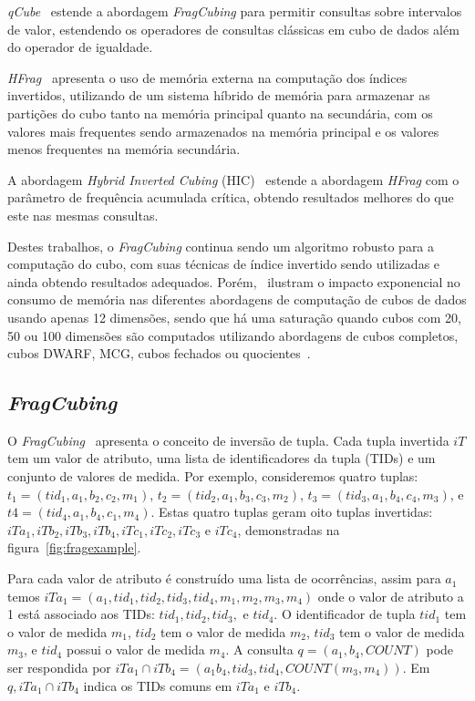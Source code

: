 \textit{qCube}~\cite{silvaQCubeEfficientIntegration2013} estende a abordagem \textit{FragCubing} para permitir consultas sobre intervalos de valor, estendendo os operadores de consultas clássicas em cubo de dados além do operador de igualdade.

\textit{HFrag}~\cite{silvaHybridMemoryData2015} apresenta o uso de memória externa na computação dos índices invertidos, utilizando de um sistema híbrido de memória para armazenar as partições do cubo tanto na memória principal quanto na secundária, com os valores mais frequentes sendo armazenados na memória principal e os valores menos frequentes na memória secundária.

A abordagem \textit{Hybrid Inverted Cubing} (HIC)~\cite{silvaComputingBIGData2016} estende a abordagem \textit{HFrag} com o parâmetro de frequência acumulada crítica, obtendo resultados melhores do que este nas mesmas consultas.

Destes trabalhos, o \textit{FragCubing} continua sendo um algoritmo robusto para a computação do cubo, com suas técnicas de índice invertido sendo utilizadas e ainda obtendo resultados adequados.
Porém,~ ilustram o impacto exponencial no consumo de memória nas diferentes abordagens de computação de cubos de dados usando apenas 12 dimensões, sendo que há uma saturação quando cubos com 20, 50 ou 100 dimensões são computados utilizando abordagens de cubos completos, cubos DWARF, MCG, cubos fechados ou quocientes~\cite{silva:2015:abordagensParaCubo}.

\subsection{\textit{FragCubing}}\label{ch:corr:cube:frag}

O \textit{FragCubing}~\cite{liHighdimensionalOLAPMinimal2004} apresenta o conceito de inversão de tupla.
Cada tupla invertida $iT$ tem um valor de atributo, uma lista de identificadores da tupla (TIDs) e um conjunto de valores de medida.
Por exemplo, consideremos quatro tuplas: $t_1 = (tid_1, a_1, b_2, c_2, m_1)$, $t_2 = (tid_2, a_1, b_3, c_3, m_2)$, $t_3 = (tid_3, a_1, b_4, c_4, m_3)$, e $t4 = (tid_4, a_1, b_4, c_1, m_4)$.
Estas quatro tuplas geram oito tuplas invertidas: $iTa_1, iTb_2, iTb_3, iTb_4, iTc_1, iTc_2, iTc_3$ e $iTc_4$, demonstradas na figura~\ref{fig:fragexample}.

Para cada valor de atributo é construído uma lista de ocorrências, assim para $a_1$ temos $iTa_1 = (a_1, tid_1, tid_2, tid_3, tid_4, m_1, m_2, m_3, m_4)$ onde o valor de atributo a 1 está associado aos TIDs: $tid_1, tid_2, tid_3,$ e $tid_4$.
O identificador de tupla $tid_1$ tem o valor de medida $m_1$, $tid_2$ tem o valor de medida $m_2$, $tid_3$ tem o valor de medida $m_3$, e $tid_4$ possui o valor de medida $m_4$.
A consulta $q = (a_1, b_4, COUNT)$ pode ser respondida por $iTa_1 \cap iTb_4 = (a_1b_4, tid_3, tid_4, COUNT(m_3, m_4))$.
Em $q, iTa_1 \cap iTb_4$ indica os TIDs comuns em $iTa_1$ e $iTb_4$.

